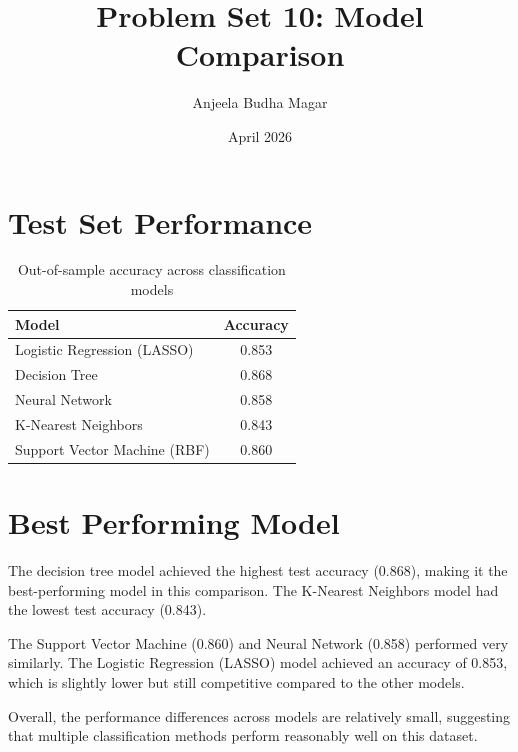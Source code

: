 \documentclass[11pt]{article}
\title{Problem Set 10: Model Comparison}
\author{Anjeela Budha Magar}
\date{April 2026}
\begin{document}
\maketitle

\section*{Test Set Performance}

\begin{table}[h!]
\centering
\begin{tabular}{l c}
\toprule
Model & Accuracy \\
\midrule
Logistic Regression (LASSO) & 0.853 \\
Decision Tree & 0.868 \\
Neural Network & 0.858 \\
K-Nearest Neighbors & 0.843 \\
Support Vector Machine (RBF) & 0.860 \\
\bottomrule
\end{tabular}
\caption{Out-of-sample accuracy across classification models}
\end{table}

\section*{Best Performing Model}

The decision tree model achieved the highest test accuracy (0.868), making it the best-performing model in this comparison. The K-Nearest Neighbors model had the lowest test accuracy (0.843).

The Support Vector Machine (0.860) and Neural Network (0.858) performed very similarly. The Logistic Regression (LASSO) model achieved an accuracy of 0.853, which is slightly lower but still competitive compared to the other models.

Overall, the performance differences across models are relatively small, suggesting that multiple classification methods perform reasonably well on this dataset.
\end{document}
